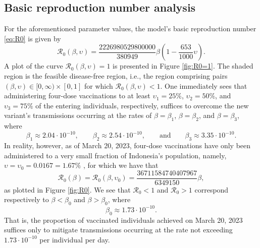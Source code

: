 \documentclass[11pt,reqno]{amsart}
\newcommand{\cR}{\mathcal{R}}
\begin{document}
\subsection{Basic reproduction number analysis}
For the aforementioned parameter values, the model's basic reproduction number \eqref{eq:R0} is given by
\begin{equation}\label{eq:R0dlmbetaupsilon}
\mathcal{R}_0\left(\beta,\upsilon\right)=\frac{2226980529800000}{380949}\beta\left(1-\frac{653}{1000}\upsilon\right).
\end{equation}
A plot of the curve $\mathcal{R}_0\left(\beta,\upsilon\right)=1$ is presented in Figure \ref{fig:R0=1}. The shaded region is the feasible disease-free region, i.e., the region comprising pairs $(\beta,\upsilon)\in[0,\infty)\times [0,1]$ for which $\cR_0(\beta,\upsilon)<1$. One immediately sees that administering four-dose vaccinations to at least $\upsilon_1=25\%$, $\upsilon_2=50\%$, and $\upsilon_3=75\%$ of the entering individuals, respectively, suffices to overcome the new variant's transmissions occurring at the rates of $\beta=\beta_1$, $\beta=\beta_2$, and $\beta=\beta_3$, where
$$\beta_1\approx 2.04\cdot 10^{-10},\qquad \beta_2\approx 2.54\cdot 10^{-10},\qquad\text{and}\qquad \beta_3\approx 3.35\cdot 10^{-10}.$$
In reality, however, as of March 20, 2023, four-dose vaccinations have only been administered to a very small fraction of Indonesia's population, namely, $\upsilon=\upsilon_0=0.0167=1.67\%$ \cite{SatuanTugas}, for which we have that
\begin{equation}\label{eq:R0dlmbeta}
\mathcal{R}_0\left(\beta\right)=\mathcal{R}_0\left(\beta,\upsilon_0\right)=\frac{36711584740407967}{6349150}\beta,
\end{equation}
as plotted in Figure \ref{fig:R0}. We see that $\cR_0<1$ and $\cR_0>1$ correspond respectively to $\beta<\beta_0$ and $\beta>\beta_0$, where $$\beta_0\approx 1.73\cdot 10^{-10}.$$
That is, the proportion of vaccinated individuals achieved on March 20, 2023 suffices only to mitigate transmissions occurring at the rate not exceeding $1.73\cdot 10^{-10}$ per individual per day.
\end{document}

